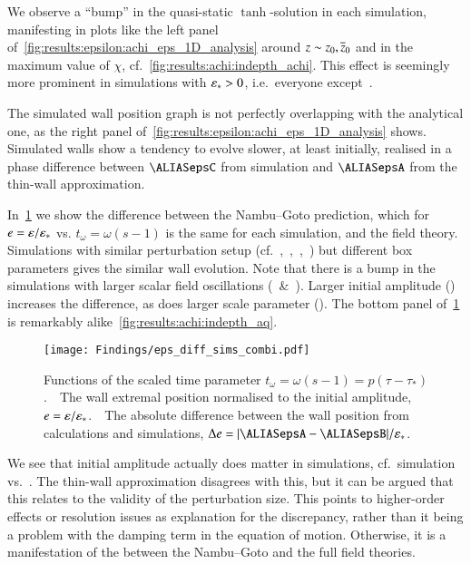 We observe a ``bump'' in the quasi-static $\tanh$-solution in each simulation, manifesting in plots like the left panel of~\cref{fig:results:epsilon:achi_eps_1D_analysis} around $z\sim z_0,\overline{z}_0$ and in the maximum value of $\chi$, cf.~\cref{fig:results:achi:indepth_achi}. This effect is seemingly more prominent in simulations with $\varepsilon_\ast >0$, i.e.~everyone except~. 

The simulated wall position graph is not perfectly overlapping with the analytical one, as the right panel of~\cref{fig:results:epsilon:achi_eps_1D_analysis} shows. Simulated walls show a tendency to evolve slower, at least initially, realised in a phase difference between $\epsC$ from simulation and $\epsA$ from the thin-wall approximation.%


In~\cref{fig:results:epsilon:eps_diff_sims_combi} we show the difference between the Nambu--Goto prediction, which for $e=\varepsilon/\varepsilon_\ast$ vs. $t_\omega=\omega (s-1)$ is the same for each simulation, and the field theory. Simulations with similar perturbation setup (cf.~,~,~,~) but different box parameters gives the similar wall evolution. Note that there is a bump in the simulations with larger scalar field oscillations (~\&~). %
Larger initial amplitude () increases the difference, as does larger scale parameter (). %
The bottom panel of~\cref{fig:results:epsilon:eps_diff_sims_combi} is remarkably alike~\cref{fig:results:achi:indepth_aq}.
\begin{figure}[h]
    \centering
    \texttt{[image: Findings/eps\_diff\_sims\_combi.pdf]}
    \caption{Functions of the scaled time parameter $t_\omega = \omega (s-1) = p(\tau-\tau_\ast)$.~~The wall extremal position normalised to the initial amplitude, $e=\varepsilon/\varepsilon_\ast$.~~The absolute difference between the wall position from calculations and simulations, $\Delta e = \abs{\epsA-\epsB}/\epsast$.}
    \label{fig:results:epsilon:eps_diff_sims_combi}
\end{figure}


We see that initial amplitude actually does matter in simulations, cf.~simulation  vs.~. The thin-wall approximation disagrees with this, but it can be argued that this relates to the validity of the perturbation size. %
This points to higher-order effects or resolution issues as explanation for the discrepancy, rather than it being a problem with the damping term in the equation of motion. Otherwise, it is a manifestation of the  between the Nambu--Goto and the full field theories. 

